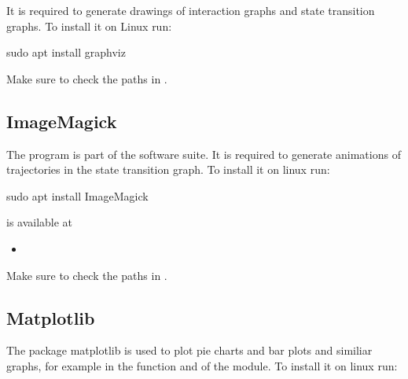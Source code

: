 \documentclass[letterpaper,10pt,english]{sphinxmanual}
\begin{document}
It is required to generate drawings of interaction graphs and state transition graphs.
To install it on Linux run:

\begin{sphinxVerbatim}[commandchars=\\\{\}]
\PYGZdl{} sudo apt install graphviz
\end{sphinxVerbatim}

Make sure to check the paths in .


\subsection{ImageMagick}
\label{\detokenize{Installation:imagemagick}}\label{\detokenize{Installation:installation-imagemagick}}
The program  is part of the  software suite.
It is required to generate animations of trajectories in the state transition graph.
To install it on linux run:

\begin{sphinxVerbatim}[commandchars=\\\{\}]
\PYGZdl{} sudo apt install ImageMagick
\end{sphinxVerbatim}

 is available at
\begin{itemize}
\item {} 

\end{itemize}

Make sure to check the paths in .


\subsection{Matplotlib}
\label{\detokenize{Installation:matplotlib}}\label{\detokenize{Installation:installation-matplotlib}}
The package matplotlib is used to plot pie charts and bar plots and similiar graphs,
for example in the function {\hyperref[\detokenize{Basins:create-barplot}]{}} and {\hyperref[\detokenize{Basins:basins-create-piechart}]{}} of the {\hyperref[\detokenize{Basins:basins}]{}} module.
To install it on linux run:
\end{document}
